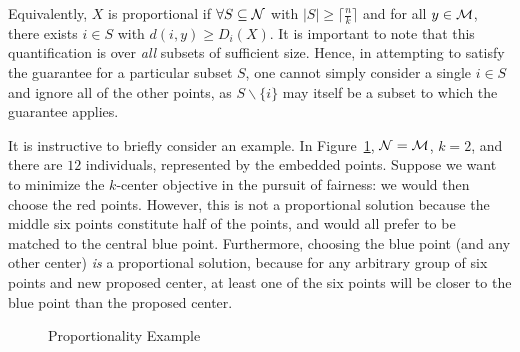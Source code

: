 Equivalently, %
$X$ is proportional if $\forall S \subseteq \mathcal {N}$ with $|S| \geq \lceil \frac{n}{k} \rceil$ and for all $y \in \mathcal{M}$, there exists $i \in S$ with $d(i, y) \geq D_i(X)$. It is important to note that this quantification is over \textit{all} subsets of sufficient size. Hence, in attempting to satisfy the guarantee for a particular subset $S$, one cannot simply consider a single $i \in S$ and ignore all of the other points, as $S \backslash \{i\}$ may itself be a subset to which the guarantee applies.

It is instructive to briefly consider an example. In Figure~\ref{fig:coreExample}, $\mathcal {N} = \mathcal{M}$, $k = 2$, and there are $12$ individuals, represented by the embedded points. Suppose we want to minimize the $k$-center objective in the pursuit of fairness: we would then choose the red points. However, this is not a proportional solution because the middle six points constitute half of the points, and would all prefer to be matched to the central blue point. Furthermore, choosing the blue point (and any other center) \textit{is} a proportional solution, because for any arbitrary group of six points and new proposed center, at least one of the six points will be closer to the blue point than the proposed center. 

\begin{figure}[h]
\centering
{}
\caption{Proportionality Example}
\label{fig:coreExample}
\end{figure} 

